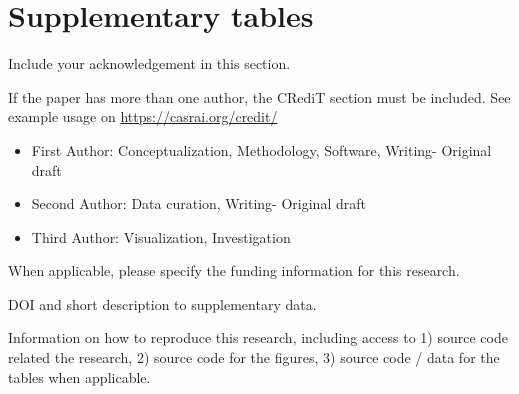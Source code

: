 \documentclass[
  manuscript=proceedings,  %
  layout=preprint,  %
  year=20xx,
  volume=x,
]{extra/joas}
\begin{document}
\section{Supplementary tables}
\blindtext


\begin{acknowledgement}
  Include your acknowledgement in this section.
\end{acknowledgement}

\begin{credit}
  If the paper has more than one author, the CRediT section must be included. See example usage on \url{https://casrai.org/credit/}

  \begin{itemize}
    \item First Author: Conceptualization, Methodology, Software, Writing- Original draft
    \item Second Author: Data curation, Writing- Original draft
    \item Third Author: Visualization, Investigation
  \end{itemize}
\end{credit}


\begin{funding}
  When applicable, please specify the funding information for this research.
\end{funding}


\begin{opendata}
  DOI and short description to supplementary data.
\end{opendata}

\begin{reproduce}
Information on how to reproduce this research, including access to 1) source code related the research, 2) source code for the figures, 3) source code / data for the tables when applicable.
\end{reproduce}



\printbibliography
\end{document}
